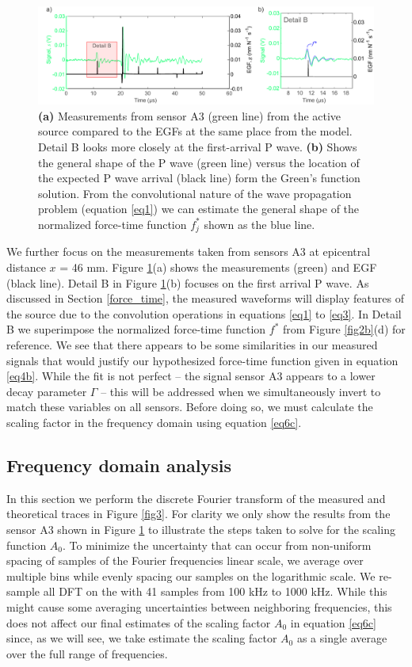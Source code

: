 \documentclass[preprint,3p, 11pt,authoryear]{elsarticle}
\begin{document}
\begin{figure}[ht]
     	\centering
\includegraphics[scale= 0.85]{FIG5.pdf} 
\caption{\textbf{(a)} Measurements from sensor A3 (green line) from the active source compared to the EGFs at the same place from the model.  Detail B looks more closely at the first-arrival P wave. \textbf{(b)} Shows the general shape of the P wave (green line) versus the location of the expected P wave arrival (black line) form the Green's function solution.  From the convolutional nature of the wave propagation problem (equation \eqref{eq1}) we can estimate the general shape of the normalized force-time function $f^{*}_{j}$ shown as the blue line.}
	\label{fig5} 
\end{figure}

We further focus on the measurements taken from sensors A3 at epicentral distance $x$ = 46 mm. Figure \ref{fig5}(a) shows the measurements (green) and EGF (black line).  Detail B in Figure \ref{fig5}(b) focuses on the first arrival P wave. As discussed in Section \ref{force_time}, the measured waveforms will display features of the source due to the convolution operations in equations \eqref{eq1} to \eqref{eq3}. In Detail B we superimpose the normalized force-time function $f^{*}$ from Figure \ref{fig2b}(d) for reference. We see that there appears to be some similarities in our measured signals that would justify our hypothesized force-time function given in equation \eqref{eq4b}.  While the fit is not perfect -- the signal sensor A3 appears to a lower decay parameter $\Gamma$ -- this will be addressed when we simultaneously invert to match these variables on all sensors. Before doing so, we must calculate the scaling factor in the frequency domain using equation \eqref{eq6c}.

\subsection{Frequency domain analysis}
In this section we perform the discrete Fourier transform of the measured and theoretical traces in Figure \ref{fig3}.  For clarity we only show the results from the sensor A3 shown in Figure \ref{fig5} to illustrate the steps taken to solve for the scaling function $A_{0}$. To minimize the uncertainty that can occur from non-uniform spacing of samples of the Fourier frequencies linear scale, we average over multiple bins while evenly spacing our samples on the logarithmic scale.  We re-sample all DFT on the with 41 samples from 100 kHz to 1000 kHz.  While this might cause some averaging uncertainties between neighboring frequencies, this does not affect our final estimates of the scaling factor  $A_{0}$ in equation \eqref{eq6c} since, as we will see, we take estimate the scaling factor $A_{0}$ as a single average over the full range of frequencies. 
\end{document}
